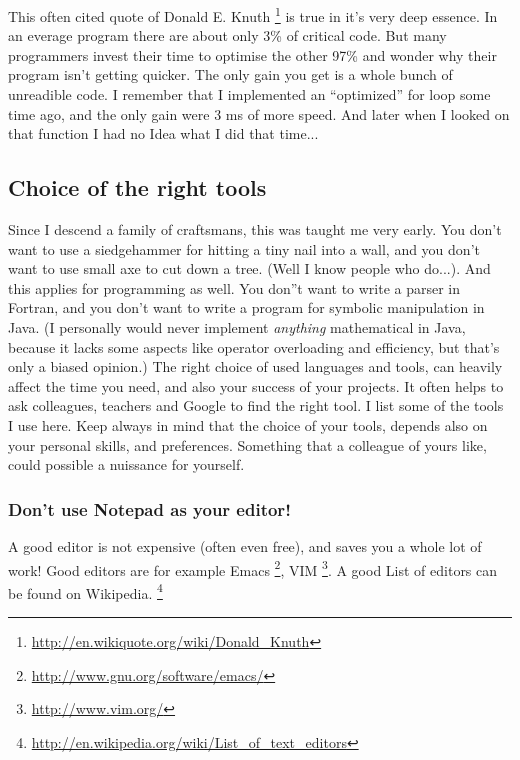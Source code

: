 \documentclass[letterpaper,10pt,english]{manual}
\begin{document}
This often cited quote of Donald E. Knuth \footnote{
\href{http://en.wikiquote.org/wiki/Donald\_Knuth}{http://en.wikiquote.org/wiki/Donald\_Knuth}
} is true in it's very deep essence. In an everage program
there are about only 3\% of critical code. But many programmers invest their time to optimise the
other 97\% and wonder why their program isn't getting quicker. The only gain you get is a whole bunch
of unreadible code. I remember that I implemented an ``optimized'' for loop some time ago, and the only gain were
3 ms of more speed. And later when I looked on that function I had no Idea what I did that time...


\subsection{Choice of the right tools}

Since I descend a family of craftsmans, this was taught me very early. You don't want to use
a siedgehammer for hitting a tiny nail into a wall, and you don't want to use small axe to cut down a tree.
(Well I know people who do...). And this applies for programming as well. You don''t want to write a parser in Fortran,
and you don't want to write a program for symbolic manipulation in Java. (I personally would never implement \emph{anything}
mathematical in Java, because it lacks some aspects like operator overloading and efficiency, but that's only a biased opinion.)
The right choice of used languages
and tools, can heavily affect the time you need, and also your success of your projects. It often helps to
ask colleagues, teachers and Google to find the right tool. I list
some of the tools I use here. Keep always in mind that the choice of
your tools, depends also on your personal skills, and
preferences. Something that a colleague of yours like, could possible
a nuissance for yourself.


\subsubsection{Don't use Notepad as your editor!}

A good editor is not expensive (often even free), and saves you a
whole lot of work! Good editors are for example Emacs \footnote{
\href{http://www.gnu.org/software/emacs/}{http://www.gnu.org/software/emacs/}
}, VIM \footnote{
\href{http://www.vim.org/}{http://www.vim.org/}
}.
A good List of editors can be found on Wikipedia. \footnote{
\href{http://en.wikipedia.org/wiki/List\_of\_text\_editors}{http://en.wikipedia.org/wiki/List\_of\_text\_editors}
}
\end{document}
